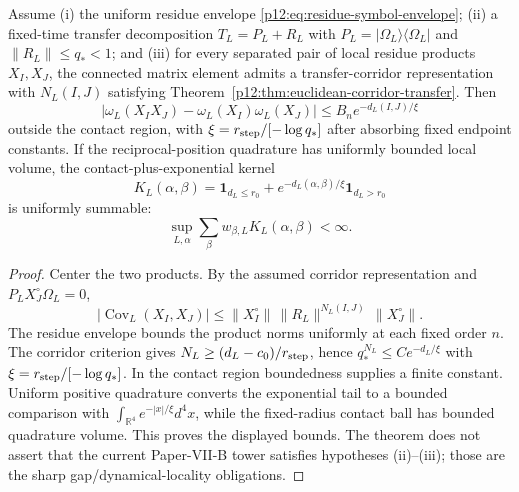\documentclass[12pt,a4paper]{article}
\begin{document}
\begin{lemma}
\label{p12:lem:residue-cluster-mixing}
Assume (i) the uniform residue envelope \eqref{p12:eq:residue-symbol-envelope}; (ii) a fixed-time transfer decomposition \(T_L=P_L+R_L\) with \(P_L=|\Omega_L\rangle\langle\Omega_L|\) and \(\|R_L\|\le q_*<1\); and (iii) for every separated pair of local residue products \(X_I,X_J\), the connected matrix element admits a transfer-corridor representation with \(N_L(I,J)\) satisfying Theorem~\ref{p12:thm:euclidean-corridor-transfer}.  Then
\begin{equation}
\label{p12:eq:residue-partition-mixing}
|\omega_L(X_IX_J)-\omega_L(X_I)\omega_L(X_J)|
\le B_n e^{-d_L(I,J)/\xi}
\end{equation}
outside the contact region, with \(\xi=r_{\rm step}/[-\log q_*]\) after absorbing fixed endpoint constants.  If the reciprocal-position quadrature has uniformly bounded local volume, the contact-plus-exponential kernel
\begin{equation}
\label{p12:eq:residue-cluster-kernel}
K_L(\alpha,\beta)=\mathbf1_{d_L\le r_0}+e^{-d_L(\alpha,\beta)/\xi}\mathbf1_{d_L>r_0}
\end{equation}
is uniformly summable:
\begin{equation}
\label{p12:eq:residue-kernel-summable}
\sup_{L,\alpha}\sum_\beta w_{\beta,L}K_L(\alpha,\beta)<\infty.
\end{equation}
\end{lemma}
\begin{proof}
Center the two products.  By the assumed corridor representation and \(P_LX_J^\circ\Omega_L=0\),
\[
|\operatorname{Cov}_L(X_I,X_J)|
\le \|X_I^\circ\|\,\|R_L\|^{N_L(I,J)}\,\|X_J^\circ\|.
\]
The residue envelope bounds the product norms uniformly at each fixed order \(n\).  The corridor criterion gives \(N_L\ge(d_L-c_0)/r_{\rm step}\), hence \(q_*^{N_L}\le C e^{-d_L/\xi}\) with \(\xi=r_{\rm step}/[-\log q_*]\).  In the contact region boundedness supplies a finite constant.  Uniform positive quadrature converts the exponential tail to a bounded comparison with \(\int_{\mathbb R^4}e^{-|x|/\xi}d^4x\), while the fixed-radius contact ball has bounded quadrature volume.  This proves the displayed bounds.  The theorem does not assert that the current Paper-VII-B tower satisfies hypotheses (ii)--(iii); those are the sharp gap/dynamical-locality obligations.
\end{proof}
\end{document}
